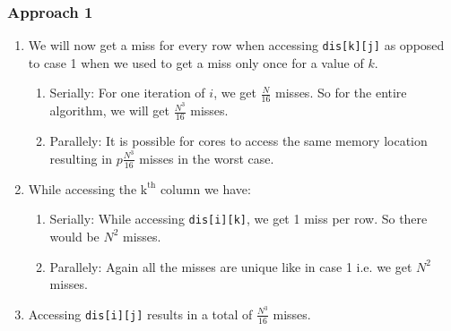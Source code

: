 \documentclass{article}
\begin{document}
\subsubsection{Approach 1}
\begin{enumerate}
    \item We will now get a miss for every row when accessing \texttt{dis[k][j]} as opposed to case 1 when we used to get a miss only once for a value of $k$.
    \begin{enumerate}
        \item Serially: For one iteration of $i$, we get $\frac{N}{16}$ misses. So for the entire algorithm, we will get $\frac{N^3}{16}$ misses.
        \item Parallely: It is possible for cores to access the same memory location resulting in $p\frac{N^3}{16}$ misses in the worst case.
    \end{enumerate}
    \item While accessing the $\mathrm{k}^{\mathrm{th}}$ column we have:
    \begin{enumerate}
        \item Serially: While accessing \texttt{dis[i][k]}, we get 1 miss per row. So there would be $N^2$ misses.
        \item Parallely: Again all the misses are unique like in case 1 i.e. we get $N^2$ misses.
    \end{enumerate}
    \item Accessing \texttt{dis[i][j]} results in a total of $\frac{N^3}{16}$ misses.
\end{enumerate}
\end{document}
